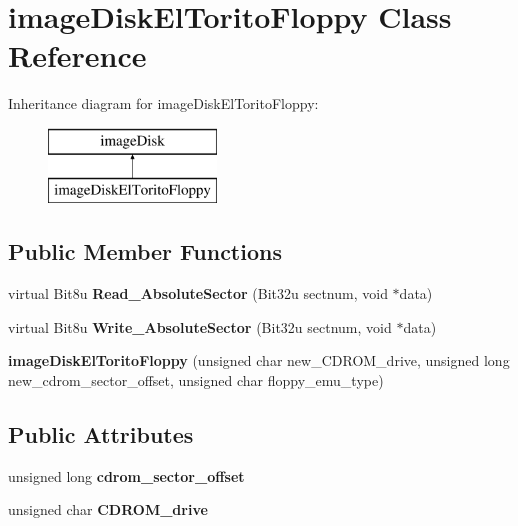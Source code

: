 \hypertarget{classimageDiskElToritoFloppy}{\section{image\-Disk\-El\-Torito\-Floppy Class Reference}
\label{classimageDiskElToritoFloppy}
}
Inheritance diagram for image\-Disk\-El\-Torito\-Floppy\-:\begin{figure}[H]
\begin{center}
\leavevmode
\includegraphics[height=2.000000cm]{classimageDiskElToritoFloppy}
\end{center}
\end{figure}
\subsection*{Public Member Functions}
\begin{DoxyCompactItemize}
\item 
\hypertarget{classimageDiskElToritoFloppy_ade907456a3ce92d9c0404318c8b35101}{virtual Bit8u {\bfseries Read\-\_\-\-Absolute\-Sector} (Bit32u sectnum, void $\ast$data)}\label{classimageDiskElToritoFloppy_ade907456a3ce92d9c0404318c8b35101}

\item 
\hypertarget{classimageDiskElToritoFloppy_add9c1cedf7e0782a1a891c2d34c47d33}{virtual Bit8u {\bfseries Write\-\_\-\-Absolute\-Sector} (Bit32u sectnum, void $\ast$data)}\label{classimageDiskElToritoFloppy_add9c1cedf7e0782a1a891c2d34c47d33}

\item 
\hypertarget{classimageDiskElToritoFloppy_a325a3fe334dc15dbf973da1c878bfa60}{{\bfseries image\-Disk\-El\-Torito\-Floppy} (unsigned char new\-\_\-\-C\-D\-R\-O\-M\-\_\-drive, unsigned long new\-\_\-cdrom\-\_\-sector\-\_\-offset, unsigned char floppy\-\_\-emu\-\_\-type)}\label{classimageDiskElToritoFloppy_a325a3fe334dc15dbf973da1c878bfa60}

\end{DoxyCompactItemize}
\subsection*{Public Attributes}
\begin{DoxyCompactItemize}
\item 
\hypertarget{classimageDiskElToritoFloppy_a547663fbe00597d9e53372a59e1fb508}{unsigned long {\bfseries cdrom\-\_\-sector\-\_\-offset}}\label{classimageDiskElToritoFloppy_a547663fbe00597d9e53372a59e1fb508}

\item 
\hypertarget{classimageDiskElToritoFloppy_af7bff4119ea850b3181ce7af0b47a879}{unsigned char {\bfseries C\-D\-R\-O\-M\-\_\-drive}}\label{classimageDiskElToritoFloppy_af7bff4119ea850b3181ce7af0b47a879}

\end{DoxyCompactItemize}


